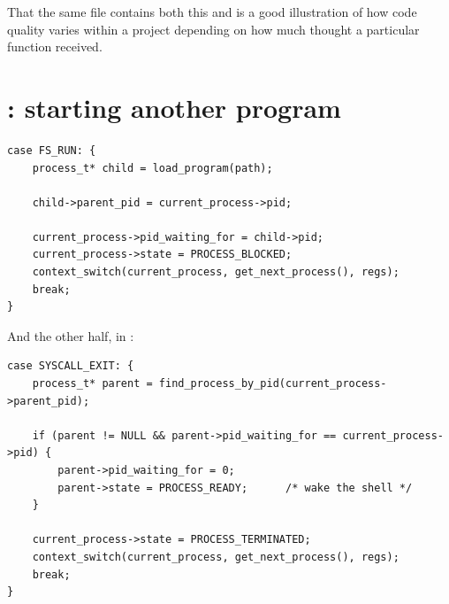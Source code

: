 That the same file contains both this and  is a good illustration of how code
quality varies within a project depending on how much thought a particular function received.

\section{: starting another program}

\begin{lstlisting}[style=c]
case FS_RUN: {
    process_t* child = load_program(path);

    child->parent_pid = current_process->pid;

    current_process->pid_waiting_for = child->pid;
    current_process->state = PROCESS_BLOCKED;
    context_switch(current_process, get_next_process(), regs);
    break;
}
\end{lstlisting}

And the other half, in :

\begin{lstlisting}[style=c]
case SYSCALL_EXIT: {
    process_t* parent = find_process_by_pid(current_process->parent_pid);

    if (parent != NULL && parent->pid_waiting_for == current_process->pid) {
        parent->pid_waiting_for = 0;
        parent->state = PROCESS_READY;      /* wake the shell */
    }

    current_process->state = PROCESS_TERMINATED;
    context_switch(current_process, get_next_process(), regs);
    break;
}
\end{lstlisting}

\begin{center}
\end{center}

